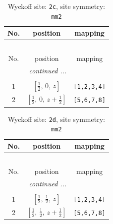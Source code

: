 \documentclass[fleqn,8pt]{jsarticle}
\begin{document}
\begin{longtable}{ccc}
\caption{Wyckoff site: {\tt 2c}, site symmetry: {\tt mm2}}
 \\
 \hline \hline
No. & position & mapping \\ \hline \endfirsthead

\multicolumn{2}{l}{\tablename\ \thetable{}} \\
 \hline \hline
No. & position & mapping \\ \hline \endhead

 \hline \hline
\multicolumn{2}{r}{\footnotesize\it continued ...} \\ \endfoot

 \hline \hline
\multicolumn{2}{r}{} \\ \endlastfoot

1 & $\left[ \frac{1}{2},\, 0,\, z \right]$ & {\tt [1,2,3,4]} \\ \hline
2 & $\left[ \frac{1}{2},\, 0,\, z + \frac{1}{2} \right]$ & {\tt [5,6,7,8]} \\
\end{longtable}
\renewcommand{\arraystretch}{1.2}
\begin{longtable}{ccc}
\caption{Wyckoff site: {\tt 2d}, site symmetry: {\tt mm2}}
 \\
 \hline \hline
No. & position & mapping \\ \hline \endfirsthead

\multicolumn{2}{l}{\tablename\ \thetable{}} \\
 \hline \hline
No. & position & mapping \\ \hline \endhead

 \hline \hline
\multicolumn{2}{r}{\footnotesize\it continued ...} \\ \endfoot

 \hline \hline
\multicolumn{2}{r}{} \\ \endlastfoot

1 & $\left[ \frac{1}{2},\, \frac{1}{2},\, z \right]$ & {\tt [1,2,3,4]} \\ \hline
2 & $\left[ \frac{1}{2},\, \frac{1}{2},\, z + \frac{1}{2} \right]$ & {\tt [5,6,7,8]} \\
\end{longtable}
\renewcommand{\arraystretch}{1.2}
\end{document}
